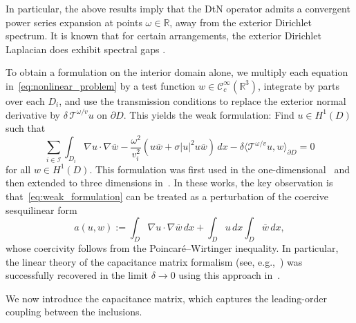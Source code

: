 \documentclass[a4paper,reqno,twoside]{amsart}
\numberwithin{equation}{section}
\theoremstyle{definition}
\newcommand{\<}{\ensuremath \leq}
\renewcommand{\>}{\ensuremath \geq}
\begin{document}
In particular, the above results imply that the DtN operator admits a convergent power series expansion at points $\omega \in \mathbb{R}$, away from the exterior Dirichlet spectrum. It is known that for certain arrangements, the exterior Dirichlet Laplacian does exhibit spectral gaps \cite{d2023gaps, ferraresso2015singular}.

To obtain a formulation on the interior domain alone, we multiply each equation in~\eqref{eq:nonlinear_problem} by a test function $w \in \mathcal{C}^\infty_c(\mathbb{R}^3)$, integrate by parts over each $D_i$, and use the transmission conditions to replace the exterior normal derivative by $\delta\,\mathcal{T}^{\omega/v} u$ on $\partial D$. This yields the weak formulation: Find $u \in H^1(D)$ such that
\begin{equation}\label{eq:weak_formulation}
    \sum_{i\in \mathcal{I}}\int_{D_i}\nabla u \cdot\nabla \overline{w} - \frac{\omega^2}{v_i^2}\left(u\overline{w} + \sigma \lvert u\rvert^2 u \overline{w}\right)\,dx - \delta \langle \mathcal{T}^{\omega/v} u, w\rangle_{\partial D} = 0
\end{equation}
for all $w \in H^1(D)$. This formulation was first used in the one-dimensional~\cite{feppon.cheng.ea2023Subwavelength} and then extended to three dimensions in~\cite{fepponSubwavelength2024}. In these works, the key observation is that~\eqref{eq:weak_formulation} can be treated as a perturbation of the coercive sesquilinear form
\begin{equation}
    a(u,w) := \int_D \nabla u \cdot \nabla \overline{w}\,dx + \int_D u\,dx \int_D \overline{w}\,dx,
\end{equation}
whose coercivity follows from the Poincar\'e--Wirtinger inequality. In particular, the linear theory of the capacitance matrix formalism (see, e.g.,~\cite{ammari.davies.ea2024Functional,cbms}) was successfully recovered in the limit $\delta\rightarrow 0$ using this approach in~\cite{fepponSubwavelength2024, ammariNonlinear2025}.

We now introduce the capacitance matrix, which captures the leading-order coupling between the inclusions.
\end{document}
